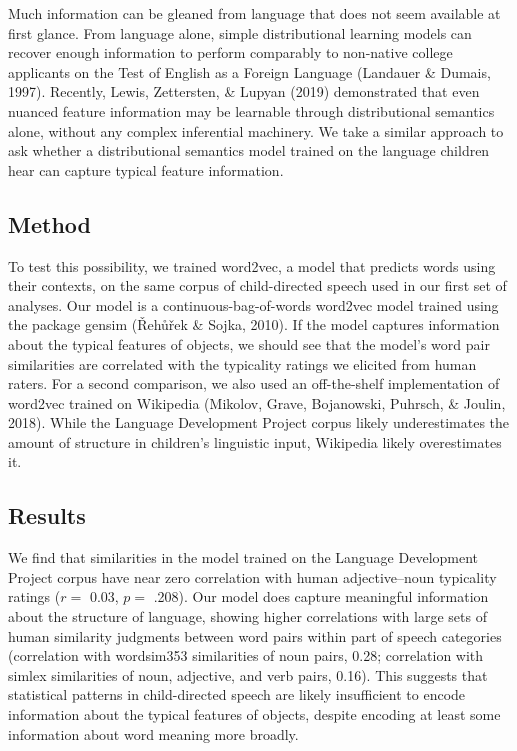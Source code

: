 \documentclass[10pt, letterpaper]{article}
\begin{document}
Much information can be gleaned from language that does not seem
available at first glance. From language alone, simple distributional
learning models can recover enough information to perform comparably to
non-native college applicants on the Test of English as a Foreign
Language (Landauer \& Dumais, 1997). Recently, Lewis, Zettersten, \&
Lupyan (2019) demonstrated that even nuanced feature information may be
learnable through distributional semantics alone, without any complex
inferential machinery. We take a similar approach to ask whether a
distributional semantics model trained on the language children hear can
capture typical feature information.

\hypertarget{method}{%
\subsection{Method}\label{method}}

To test this possibility, we trained word2vec, a model that predicts
words using their contexts, on the same corpus of child-directed speech
used in our first set of analyses. Our model is a
continuous-bag-of-words word2vec model trained using the package gensim
(Řehůřek \& Sojka, 2010). If the model captures information about the
typical features of objects, we should see that the model's word pair
similarities are correlated with the typicality ratings we elicited from
human raters. For a second comparison, we also used an off-the-shelf
implementation of word2vec trained on Wikipedia (Mikolov, Grave,
Bojanowski, Puhrsch, \& Joulin, 2018). While the Language Development
Project corpus likely underestimates the amount of structure in
children's linguistic input, Wikipedia likely overestimates it.

\hypertarget{results-1}{%
\subsection{Results}\label{results-1}}

We find that similarities in the model trained on the Language
Development Project corpus have near zero correlation with human
adjective--noun typicality ratings (\(r =\) 0.03, \(p =\) .208). Our
model does capture meaningful information about the structure of
language, showing higher correlations with large sets of human
similarity judgments between word pairs within part of speech categories
(correlation with wordsim353 similarities of noun pairs, 0.28;
correlation with simlex similarities of noun, adjective, and verb pairs,
0.16). This suggests that statistical patterns in child-directed speech
are likely insufficient to encode information about the typical features
of objects, despite encoding at least some information about word
meaning more broadly.
\end{document}
